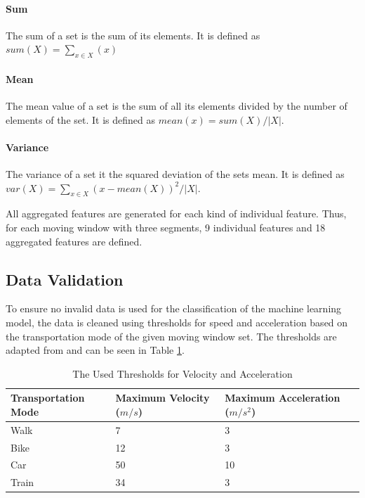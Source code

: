 \paragraph{Sum} The sum of a set is the sum of its elements. It is defined as $sum(X) = \sum_{x\in X} (x)$

\paragraph{Mean} The mean value of a set is the sum of all its elements divided by the number of elements of the set. It is defined as $ mean (x) = sum(X)/|X|$.

\paragraph{Variance} The variance of a set it the squared deviation of the sets mean. It is defined as $var (X) = \sum_{x\in X} (x - mean(X))^2/|X| $.

All aggregated features are generated for each kind of individual feature. Thus, for each moving window with three segments, 9 individual features and 18 aggregated features are defined. 

\subsection{Data Validation}

To ensure no invalid data is used for the classification of the machine learning model, the data is cleaned using thresholds for speed and acceleration based on the transportation mode of the given moving window set. The thresholds are adapted from \cite{Dabiri2018} and can be seen in Table \ref{table:thresholds}.
 
\begin{table}[h!]
    \centering
    \begin{tabular}{|l l l l|} 
     \toprule
     Transportation Mode & Maximum Velocity ($m/s$) & Maximum Acceleration ($m/s^2$)\\
     \midrule
     Walk & 7 & 3 \\
     Bike & 12 & 3 \\
     Car & 50 & 10 \\
     Train & 34 & 3 \\
     \bottomrule
    \end{tabular}
    \caption{The Used Thresholds for Velocity and Acceleration \cite{Dabiri2018}}
    \label{table:thresholds}
\end{table}

